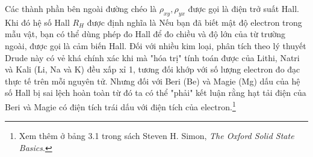 \noindent Các thành phần bên ngoài đường chéo là $\rho_{xy}, \rho_{yx}$ được gọi là điện trở suất Hall. Khi đó hệ số Hall $R_H$ được định nghĩa là
Nếu bạn đã biết mật độ electron trong mẫu vật, bạn có thể dùng phép đo Hall để đo chiều và độ lớn của từ trường ngoài, được gọi là cảm biến Hall.
Đối với nhiều kim loại, phân tích theo lý thuyết Drude này có vẻ khá chính xác khi mà "hóa trị" tính toán được của Lithi, Natri và Kali (Li, Na và K) đều xấp xỉ 1, tương đối khớp với số lượng electron đo đạc thực tế trên mỗi nguyên tử.
Nhưng đối với  Beri (Be) và Magie (Mg) dấu của hệ số Hall bị sai lệch hoàn toàn từ đó ta có thể "phải" kết luận rằng hạt tải điện của Beri và Magie có điện tích trái dấu với điện tích của electron.\footnote{Xem thêm ở bảng 3.1 trong sách Steven H. Simon, \textit{The Oxford Solid State Basics}.}
